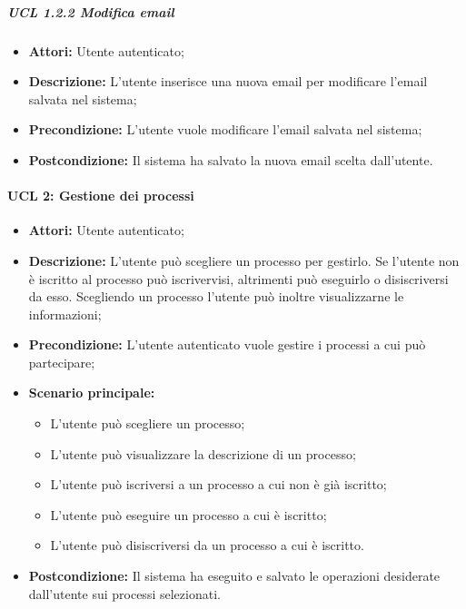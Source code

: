 \subparagraph{UCL 1.2.2  Modifica email}
\begin{itemize}
\item \textbf{Attori:} Utente autenticato;
\item \textbf{Descrizione:} L'utente inserisce una nuova email per modificare l'email salvata nel sistema;
\item \textbf{Precondizione:} L'utente vuole modificare l'email salvata nel sistema;
\item \textbf{Postcondizione:} Il sistema ha salvato la nuova email scelta dall'utente.
\end{itemize}

\paragraph{UCL 2: Gestione dei processi}
\begin{itemize}
\item \textbf{Attori:} Utente autenticato;
\item \textbf{Descrizione:} L'utente può scegliere un processo per gestirlo.
Se l'utente non è iscritto al processo può iscrivervisi, altrimenti può eseguirlo o disiscriversi da esso.
Scegliendo un processo l'utente può inoltre visualizzarne le informazioni;
\item \textbf{Precondizione:} L'utente autenticato vuole gestire i processi a cui può partecipare;
\item \textbf{Scenario principale:}
\begin{itemize}
\item L'utente può scegliere un processo;
\item L'utente può visualizzare la descrizione di un processo;
\item L'utente può iscriversi a un processo a cui non è già iscritto;
\item L'utente può eseguire un processo a cui è iscritto;
\item L'utente può disiscriversi da un processo a cui è iscritto.
\end{itemize}
\item \textbf{Postcondizione:} Il sistema ha eseguito e salvato le operazioni desiderate dall'utente sui processi selezionati.
\end{itemize}

